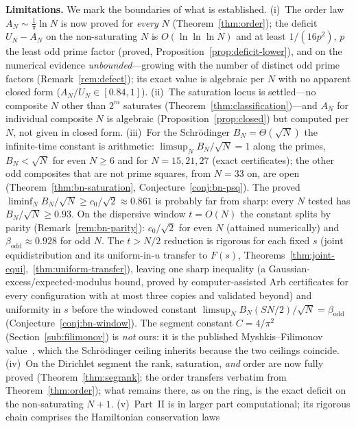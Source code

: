 \documentclass[11pt,reqno]{amsart}
\theoremstyle{plain}
\theoremstyle{definition}
\begin{document}
\medskip\noindent\textbf{Limitations.} We mark the boundaries of what is established. (i)~The order law
$A_N\sim\tfrac1\pi\ln N$ is now proved for \emph{every} $N$ (Theorem~\ref{thm:order}); the deficit
$U_N-A_N$ on the non-saturating $N$ is $O(\ln\ln\ln N)$ and at least $1/(16p^2)$, $p$ the least odd prime factor
(proved, Proposition~\ref{prop:deficit-lower}), and on the numerical evidence
\emph{unbounded}---growing with the number of distinct odd prime factors (Remark~\ref{rem:defect}); its
exact value is algebraic per $N$ with no apparent closed form
($A_N/U_N\in[0.84,1]$). (ii)~The saturation locus is settled---no composite $N$ other than $2^m$
saturates (Theorem~\ref{thm:classification})---and $A_N$ for individual composite $N$ is algebraic
(Proposition~\ref{prop:closed}) but computed per $N$, not given in closed form. (iii)~For the Schr\"odinger
$B_N=\Theta(\sqrt N)$ the infinite-time constant is arithmetic: $\limsup_NB_N/\sqrt N=1$ along the primes,
$B_N<\sqrt N$ for even $N\ge6$ and for $N=15,21,27$ (exact certificates); the other odd composites
that are not prime squares, from $N=33$ on, are open
(Theorem~\ref{thm:bn-saturation}, Conjecture~\ref{conj:bn-psq}). The proved
$\liminf_NB_N/\sqrt N\ge c_0/\sqrt2\approx0.861$ is probably far from sharp: every $N$ tested has
$B_N/\sqrt N\ge0.93$. On the dispersive window $t=O(N)$ the constant splits by parity
(Remark~\ref{rem:bn-parity}): $c_0/\sqrt2$ for even $N$ (attained numerically) and $\beta_{\mathrm{odd}}\approx0.928$
for odd $N$. The $t>N/2$ reduction is rigorous for each fixed $s$ (joint equidistribution and its uniform-in-$u$
transfer to $F(s)$, Theorems~\ref{thm:joint-equi},~\ref{thm:uniform-transfer}), leaving one sharp
inequality (a Gaussian-excess/expected-modulus bound, proved by computer-assisted Arb certificates for every
configuration with at most three copies and validated beyond) and uniformity in $s$ before the windowed constant
$\limsup_NB_N(SN/2)/\sqrt N=\beta_{\mathrm{odd}}$ (Conjecture~\ref{conj:bn-window}). The segment constant $C=4/\pi^2$ (Section~\ref{sub:filimonov}) is \emph{not} ours: it is the
published Myshkis--Filimonov value~\cite[Thm.~2]{MF03}, which the Schr\"odinger ceiling inherits because the
two ceilings coincide. (iv)~On the Dirichlet segment the rank, saturation, \emph{and} order are now fully
proved (Theorem~\ref{thm:segrank}; the order transfers verbatim from Theorem~\ref{thm:order}); what
remains there, as on the ring, is the exact deficit on the non-saturating $N+1$. (v)~Part~II is in larger
part computational; its rigorous chain comprises the Hamiltonian conservation laws
\end{document}
